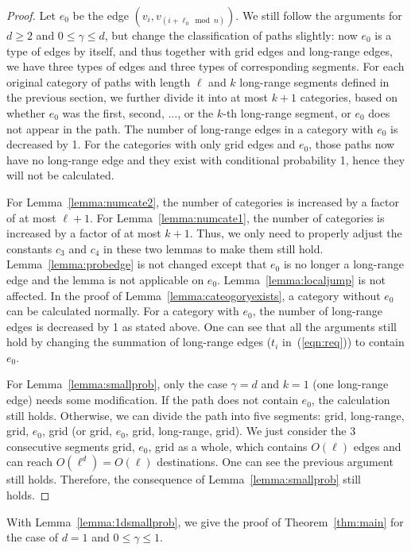 \documentclass[11pt]{article}
\begin{document}
\begin{proof}
Let $e_0$ be the edge $(v_i,v_{(i+\ell_0\bmod n)})$.
We still follow the arguments for $d\geq2$ and $0\leq\gamma\leq d$, but change the classification of paths slightly: now $e_0$ is a type of edges by itself,
	and thus together with grid edges and long-range edges, we have
	three types of edges and three types of corresponding segments.
For each original category of paths with length $\ell$ and $k$ long-range
	segments defined in the previous section, we further
	divide it into at most $k+1$ categories, based on whether 
	$e_0$ was the first, second, ..., or the $k$-th long-range segment, or
	$e_0$ does not appear in the path.
The number of long-range edges in a category with $e_0$ is decreased by 1. 
For the categories with only grid edges and $e_0$, those paths now have no 
	long-range edge and they exist with conditional probability 1, 
	hence they will not be calculated. 

For Lemma~\ref{lemma:numcate2}, the number of categories is increased by a 
	factor of at most $\ell+1$.
For Lemma~\ref{lemma:numcate1}, the number of categories is increased by a 
	factor of at most $k+1$.
Thus, we only need to properly adjust the constants $c_3$ and $c_4$ in these
	two lemmas to make them still hold.
Lemma~\ref{lemma:probedge} is not changed except that $e_0$ is no longer a long-range edge and the lemma is not applicable on $e_0$. Lemma~\ref{lemma:localjump} is not affected. In the proof of Lemma~\ref{lemma:cateogoryexists}, a category without $e_0$ can be calculated normally. For a category with $e_0$, the number of long-range edges is decreased by 1 as stated above. One can see that 
all the arguments still hold by changing the summation of long-range edges ($t_i$ in~(\ref{eqn:req})) to contain $e_0$.

For Lemma~\ref{lemma:smallprob}, only the case $\gamma=d$ and $k=1$ (one long-range edge) needs some modification. If the path does not contain $e_0$, the calculation still holds. Otherwise, we can divide the path into five segments: grid, long-range, grid, $e_0$, grid (or grid, $e_0$, grid, long-range, grid). We just consider the 3 consecutive segments grid, $e_0$, grid as a whole, which contains $O(\ell)$ edges and can reach $O(\ell^d)=O(\ell)$ destinations. One can see the previous argument still holds. Therefore, the consequence of Lemma~\ref{lemma:smallprob} still holds.
\end{proof}

With Lemma~\ref{lemma:1dsmallprob}, we give the proof of Theorem~\ref{thm:main} for the case of $d=1$ and $0\leq\gamma \le 1$.
\end{document}
